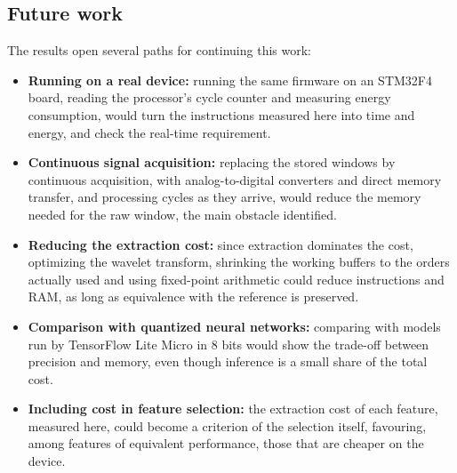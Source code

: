 \documentclass[11pt,a4paper]{article}
\begin{document}
\subsection*{Future work}
The results open several paths for continuing this work:
\begin{itemize}
    \item \textbf{Running on a real device:} running the same firmware on an STM32F4 board, reading the processor's cycle counter and measuring energy consumption, would turn the instructions measured here into time and energy, and check the real-time requirement.
    \item \textbf{Continuous signal acquisition:} replacing the stored windows by continuous acquisition, with analog-to-digital converters and direct memory transfer, and processing cycles as they arrive, would reduce the memory needed for the raw window, the main obstacle identified.
    \item \textbf{Reducing the extraction cost:} since extraction dominates the cost, optimizing the wavelet transform, shrinking the working buffers to the orders actually used and using fixed-point arithmetic could reduce instructions and RAM, as long as equivalence with the reference is preserved.
    \item \textbf{Comparison with quantized neural networks:} comparing with models run by TensorFlow Lite Micro \citep{david_tflm} in 8 bits would show the trade-off between precision and memory, even though inference is a small share of the total cost.
    \item \textbf{Including cost in feature selection:} the extraction cost of each feature, measured here, could become a criterion of the selection itself, favouring, among features of equivalent performance, those that are cheaper on the device.
\end{itemize}



\end{document}
